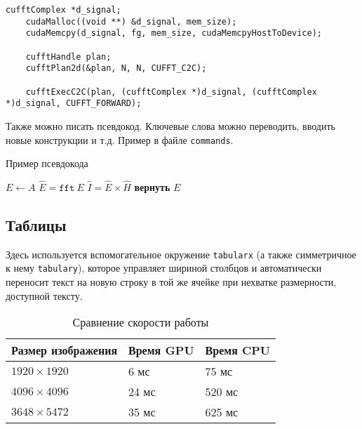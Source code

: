 \begin{lstlisting}[caption={Пример вызова БПФ в библиотеке \texttt{CuFFT}}]
	cufftComplex *d_signal;
	cudaMalloc((void **) &d_signal, mem_size); 
	cudaMemcpy(d_signal, fg, mem_size, cudaMemcpyHostToDevice);
	
	cufftHandle plan;
	cufftPlan2d(&plan, N, N, CUFFT_C2C);
	
	cufftExecC2C(plan, (cufftComplex *)d_signal, (cufftComplex *)d_signal, CUFFT_FORWARD);
\end{lstlisting}

Также можно писать псевдокод. Ключевые слова можно переводить, вводить новые конструкции и т.д. Пример в файле \texttt{commands}.
\begin{algorithm}
    \caption{Пример псевдокода}
    \begin{algorithmic}[1] %
        \State $E \gets A$
        \State $\hat{E} = \texttt{fft}~E$
        \State $\hat{I} = \hat{E}\times \hat{H}$
        \EndFor
        \State \textbf{вернуть} $E$
        \EndProcedure
    \end{algorithmic}
\end{algorithm}

\subsection{Таблицы}
Здесь используется вспомогательное окружение \texttt{tabularx} (а также симметричное к нему \texttt{tabulary}), которое управляет шириной столбцов и автоматически переносит текст на новую строку в той же ячейке при нехватке размерности, доступной тексту.

\begin{table}[H]
	\centering
	\begin{tabularx}{\textwidth}{| X | X | X |}
		\hline
		\textbf{Размер изображения} & \textbf{Время GPU} & \textbf{Время CPU} \\ \hline
		$1920\times 1920$           & 6 мс               & 75 мс              \\ \hline
		$4096\times 4096$           & 24 мс              & 520 мс             \\ \hline
		$3648\times 5472$           & 35 мс              & 625 мс             \\ \hline
	\end{tabularx}
	\caption{Сравнение скорости работы}
\end{table}


